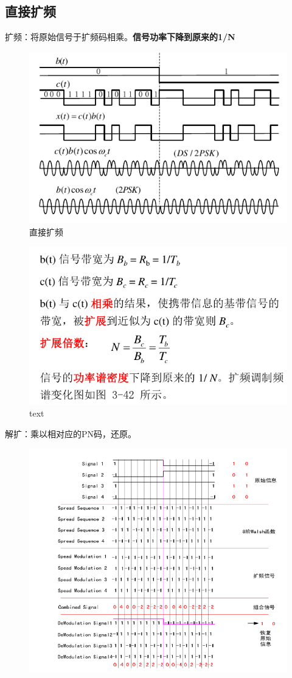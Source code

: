 \subsection{直接扩频}
扩频：将原始信号于扩频码相乘。\textbf{信号功率下降到原来的1/N}
\begin{figure}[H]
	\centering
	\includegraphics[width=0.7\linewidth]{figures/zhijiekuopin.png}
	\caption{直接扩频}
\end{figure}
\begin{figure}[H]
	\centering
	\includegraphics[width=0.7\linewidth]{figures/zhijiekuopin2.png}
	\caption{text}
\end{figure}
解扩：乘以相对应的PN码，还原。
\begin{figure}[H]
	\centering
	\includegraphics[width=0.9\linewidth]{figures/screenshot002}
	\caption{}
	\label{fig:screenshot002}
\end{figure}

